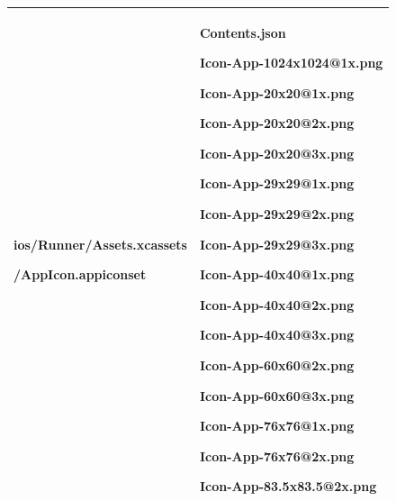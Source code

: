 \documentclass[conference]{IEEEtran}
\begin{document}
\begin{table}[h]
\begin{tabular}{|p{3.7cm}|p{4.1cm}|}
           ios/Runner/Assets.xcassets \par /AppIcon.appiconset  & \par Contents.json \par Icon-App-1024x1024@1x.png \par Icon-App-20x20@1x.png \par Icon-App-20x20@2x.png \par Icon-App-20x20@3x.png \par Icon-App-29x29@1x.png \par Icon-App-29x29@2x.png \par Icon-App-29x29@3x.png \par Icon-App-40x40@1x.png \par Icon-App-40x40@2x.png \par Icon-App-40x40@3x.png \par Icon-App-60x60@2x.png \par Icon-App-60x60@3x.png \par Icon-App-76x76@1x.png \par Icon-App-76x76@2x.png \par Icon-App-83.5x83.5@2x.png 
          \\ \hline
          

\end{tabular}
\end{table}
\end{document}
